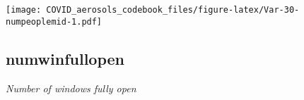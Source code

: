 \documentclass[]{article}
\begin{document}
\begin{minipage}{0.25 \textwidth}

\texttt{[image: COVID\_aerosols\_codebook\_files/figure-latex/Var-30-numpeoplemid-1.pdf]}

\end{minipage}

\noindent\makebox[\linewidth]{\rule{\textwidth}{0.4pt}}

\hypertarget{numwinfullopen}{%
\subsection{numwinfullopen}\label{numwinfullopen}}

\emph{Number of windows fully open}

\begin{minipage}{0.75 \textwidth}


\end{minipage}
\end{document}
